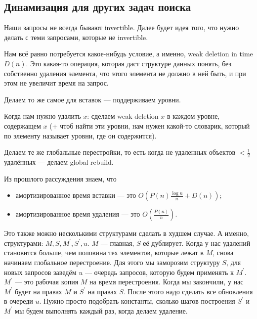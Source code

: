 \subsection{Динамизация для других задач поиска}

Наши запросы не всегда бывают invertible. Далее будет идея того, что нужно делать с теми запросами, которые не invertible.

Нам всё равно потребуется какое-нибудь условие, а именно, weak deletion in time $D(n)$. Это какая-то операция, которая даст структуре данных понять, без собственно удаления элемента, что этого элемента не должно в ней быть, и при этом не увеличит время на запрос.

Делаем то же самое для вставок — поддерживаем уровни.

Когда нам нужно удалить $x$: сделаем weak deletion $x$ в каждом уровне, содержащем $x$ (+ чтоб найти эти уровни, нам нужен какой-то словарик, который по элементу называет уровни, где он содержится).

Делаем те же глобальные перестройки, то есть когда не удаленных объектов $<\frac{1}{2}$ удалённых — делаем global rebuild.

Из прошлого рассуждения знаем, что
\begin{itemize}
    \item амортизированное время вставки — это $O\left(P(n)\frac{\log n}{n}+D(n)\right)$;
    \item амортизированное время удаления — это $O\left(\frac{P(n)}{n}\right)$.
\end{itemize}

Это также можно несколькими структурами сделать в худшем случае. А именно, структурами: $M,S,M^\prime,S^\prime,u$. $M$ — главная, $S$ её дублирует. Когда у нас удалений становится больше, чем половина тех элементов, которые лежат в $M$, снова начинаем глобальное перестроение. Для этого мы заморозим структуру $S$, для новых запросов заведём $ u$ — очередь запросов, которую будем применять к $M^\prime$. $M^\prime$ — это рабочая копия $M$ на время перестроения. Когда мы закончили, у нас $M^\prime$ будет на правах $M$ и $S^\prime$ на правах $S$. После этого надо сделать все обновления в очереди $u$. Нужно просто подобрать константы, сколько шагов построения $S^\prime$ и $M^\prime$ мы будем выполнять каждый раз, когда делаем удаление.